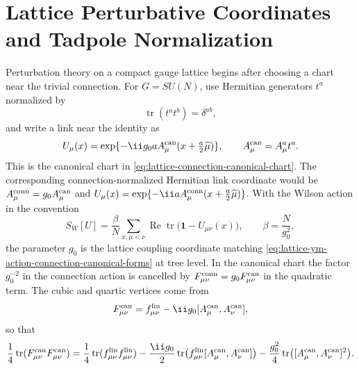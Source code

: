 \section{Lattice Perturbative Coordinates and Tadpole Normalization}
\label{sec:lattice-perturbative-coordinates-tadpole}

Perturbation theory on a compact gauge lattice begins after choosing a chart
near the trivial connection.  For \(G=SU(N)\), use Hermitian generators
\(t^a\) normalized by
\begin{equation}
  \operatorname{tr}(t^a t^b)=\delta^{ab},
  \label{eq:lattice-perturbative-trace-normalization}
\end{equation}
and write a link near the identity as
\begin{equation}
  U_\mu(x)
  =
  \exp\{-\ii g_0 a A_\mu^{\rm can}(x+\tfrac a2\widehat\mu)\},
  \qquad
  A_\mu^{\rm can}=A_\mu^a t^a .
  \label{eq:lattice-link-perturbative-coordinate}
\end{equation}
This is the canonical chart in
\eqref{eq:lattice-connection-canonical-chart}.  The corresponding
connection-normalized Hermitian link coordinate would be
\(A_\mu^{\rm conn}=g_0A_\mu^{\rm can}\) and
\(U_\mu(x)=\exp\{-\ii aA_\mu^{\rm conn}(x+\frac a2\widehat\mu)\}\).
With the Wilson action in the convention
\begin{equation}
  S_W[U]
  =
  \frac{\beta}{N}
  \sum_{x,\mu<\nu}
  \operatorname{Re}\operatorname{tr}\bigl(\mathbf 1-U_{\mu\nu}(x)\bigr),
  \qquad
  \beta=\frac{N}{g_0^2},
  \label{eq:lattice-perturbative-wilson-beta}
\end{equation}
the parameter \(g_0\) is the lattice coupling coordinate matching
\eqref{eq:lattice-ym-action-connection-canonical-forms} at tree level.  In the
canonical chart the factor \(g_0^{-2}\) in the connection action is cancelled
by \(F_{\mu\nu}^{\rm conn}=g_0F_{\mu\nu}^{\rm can}\) in the quadratic term.
The cubic and quartic vertices come from
\[
  F_{\mu\nu}^{\rm can}
  =
  f_{\mu\nu}^{\rm lin}
  -\ii g_0[A_\mu^{\rm can},A_\nu^{\rm can}],
\]
so that
\[
  \frac14\operatorname{tr}(F_{\mu\nu}^{\rm can}F_{\mu\nu}^{\rm can})
  =
  \frac14\operatorname{tr}(f_{\mu\nu}^{\rm lin}f_{\mu\nu}^{\rm lin})
  -\frac{\ii g_0}{2}
  \operatorname{tr}\bigl(f_{\mu\nu}^{\rm lin}
  [A_\mu^{\rm can},A_\nu^{\rm can}]\bigr)
  -\frac{g_0^2}{4}
  \operatorname{tr}\bigl([A_\mu^{\rm can},A_\nu^{\rm can}]^2\bigr).
\]

